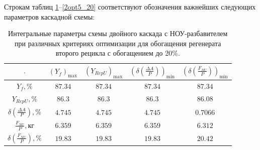 Строкам таблиц \ref{2opt2_20_int}--\ref{2opt5_20} соответствуют обозначения важнейших следующих параметров каскадной схемы:

\begin{table}
    \centering
    \begin{tabular}{|c|cccc|}
        \hline $\cdot$ & $(Y_f)_\text{max}$ & $(Y_{RepU})_\text{max}$ & $(\delta(\frac{\Delta A}{P}))_\text{min}$ & $(\delta(\frac{F_{NU}}{P}))_\text{min}$\\ \hline
        $Y_f, \%$ & $87.34$ & $87.34$ & $87.34$ & $87.34$\\ \hline
        $Y_{RepU}, \%$ & $86.3$ & $86.3$ & $86.3$ & $86.08$\\ \hline
        $\delta(\frac{\Delta A}{P}), \%$ & $4.745$ & $4.745$ & $4.745$ & $0.7066$\\ \hline
        $\frac{F_{NU}}{P}, \text{кг}$ & $6.359$ & $6.359$ & $6.359$ & $6.312$\\ \hline
        $\delta(\frac{F_{NU}}{P}), \%$ & $19.83$ & $19.83$ & $19.83$ & $20.42$\\ \hline
    \end{tabular}
    \caption{Интегральные параметры схемы двойного каскада с НОУ-разбавителем при различных критериях оптимизации для обогащения регенерата второго рецикла с обогащением до 20\%.{\label{2opt2_20_int}}}
\end{table}


